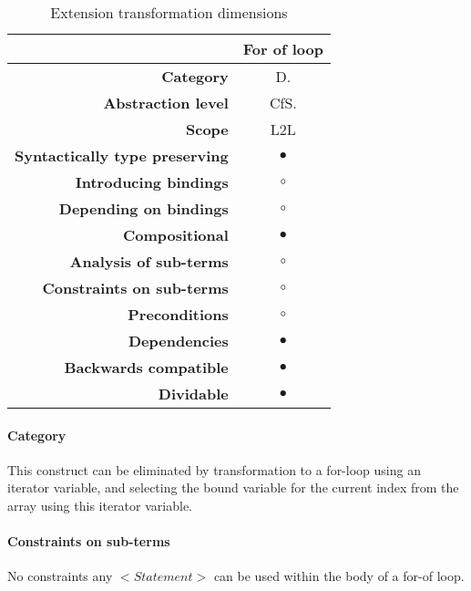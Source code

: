 \begin{table}[h]
\centering
\caption{Extension transformation dimensions}
\label{for-of-table}
\begin{tabular}{@{}rc@{}}
\toprule
                                       & \multicolumn{1}{l}{\textbf{For of loop}} \\ \midrule
\textbf{Category}                      & D.
\\
\textbf{Abstraction level}          & CfS.                          \\
\textbf{Scope}                         & L2L                               \\
\textbf{Syntactically type preserving} & $\bullet$                                          \\
\textbf{Introducing bindings}          & $\circ$                                          \\%
\textbf{Depending on bindings}         & $\circ$                                           \\
\textbf{Compositional}                 & $\bullet$                                          \\
\textbf{Analysis of sub-terms}          & $\circ$                                          \\
\textbf{Constraints on sub-terms}       & $\circ$                                           \\
\textbf{Preconditions}                 & $\circ$                                          \\
\textbf{Dependencies}                  & $\bullet$                                           \\
\textbf{Backwards compatible}          & $\bullet$                                          \\
\textbf{Dividable}                     & $\bullet$                                           \\ \bottomrule
\end{tabular}
\end{table}

\paragraph{Category}
This construct can be eliminated by transformation to a for-loop using an iterator variable, and selecting the bound variable for the current index from the array using this iterator variable.

\paragraph{Constraints on sub-terms}
No constraints any $<Statement>$ can be used within the body of a for-of loop.

